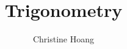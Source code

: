 \documentclass{article}
\title{Trigonometry}
\author{Christine Hoang}
\begin{document}
\maketitle

\section{}
\end{document}
